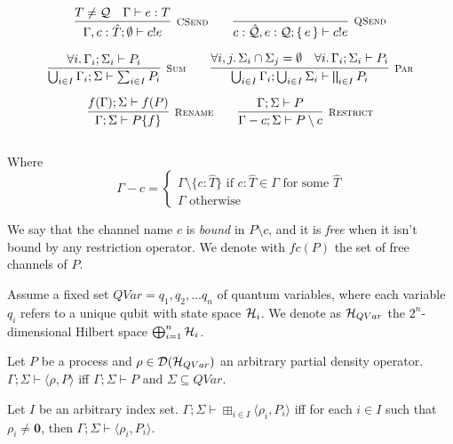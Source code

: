 \begin{gather*}
\\[0.2cm]
\infer[\mbox{\footnotesize\scshape CSend}]{\Gamma, c : \hat{T}; \emptyset \vdash c!e}{T \neq \mathcal{Q} & \Gamma \vdash e : T} \qquad
\infer[\mbox{\footnotesize\scshape QSend}]{c : \hat{\mathcal{Q}}, e:\mathcal{Q} ; \set{e} \vdash c!e}{} \\[0.2cm]
\infer[\mbox{\footnotesize\scshape Sum}]{\bigcup_{i \in I}\Gamma_i; \Sigma \vdash \sum_{i \in I} P_i}{\forall i \ldotp \Gamma_i; \Sigma_i \vdash P_i} \qquad 
\infer[\mbox{\footnotesize\scshape Par}]{\bigcup_{i \in I}\Gamma_i; \bigcup_{i \in I}\Sigma_i \vdash \bigparallel_{i \in I} P_i}
{\forall i, j \ldotp \Sigma_i \cap \Sigma_j = \emptyset & \forall i \ldotp \Gamma_i; \Sigma_i \vdash P_i} \\[0.2cm]
\infer[\mbox{\footnotesize\scshape Rename}]{\Gamma; \Sigma \vdash P \{f\}}{f(\Gamma); \Sigma \vdash f(P)} \qquad
\infer[\mbox{\footnotesize\scshape Restrict}]{\Gamma - c; \Sigma \vdash P \setminus c}{\Gamma; \Sigma \vdash P} \\[0.3cm]
\end{gather*}

Where $$\Gamma - c = \begin{cases}
\Gamma \setminus \{c : \hat{T}\} \text{ if } c: \hat{T} \in \Gamma \text{ for some } \hat{T} \\
\Gamma \text{ otherwise}
\end{cases}$$

We say that the channel name $c$ is \textit{bound} in $P\setminus c$, and it is \textit{free} when it isn't bound by any restriction operator. We denote with $fc(P)$ the set of free channels of $P$.

\begin{definition}
  Assume a fixed set  $QVar = {q_1, q_2, \ldots q_n}$ of quantum variables, where each variable $q_i$ refers to a unique qubit with state space $\mathcal{H}_i$. We denote as $\mathcal{H}_{QVar}$ the $2^n$-dimensional Hilbert space $\bigoplus_{i=1}^n \mathcal{H}_i$.

Let $P$ be a process and $\rho \in \mathcal{D}(\mathcal{H}_{QVar})$ an arbitrary partial density operator. $\Gamma; \Sigma \vdash \langle \rho, P \rangle$ iff $\Gamma; \Sigma \vdash P$ and $\Sigma \subseteq QVar$.

  Let $I$ be an arbitrary index set. $\Gamma; \Sigma \vdash \boxplus_{i \in I} \langle \rho_i, P_i \rangle$ iff for each $i \in I$ such that $\rho_i \neq \mathbf{0}$,
  then $\Gamma; \Sigma \vdash \langle \rho_i, P_i \rangle$.
\end{definition}

